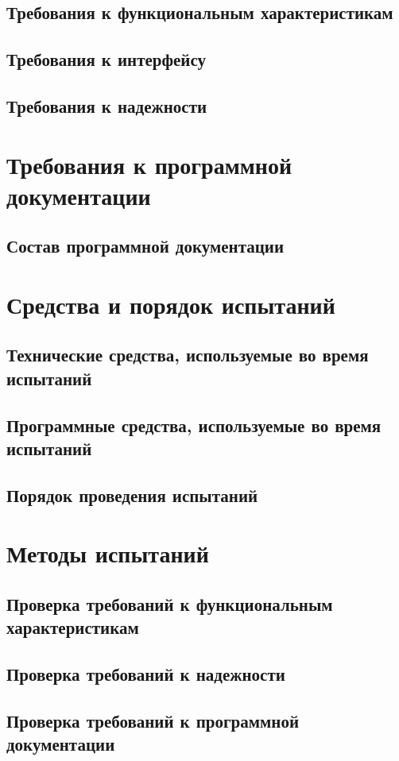 \documentclass[a4paper,12pt]{article}
\begin{document}
	\subsection{Требования к функциональным характеристикам}
	\subsection{Требования к интерфейсу}
	\subsection{Требования к надежности}
	
						\newpage
	\section{Требования к программной документации}
	\subsection{Состав программной документации}
	
						\newpage
	\section{Средства и порядок испытаний}
	\subsection{Технические средства, используемые во время испытаний}
	\subsection{Программные средства, используемые во время испытаний}
	\subsection{Порядок проведения испытаний}
	
						\newpage
	\section{Методы испытаний}
	\subsection{Проверка требований к функциональным характеристикам}
	\subsection{Проверка требований к надежности}
	\subsection{Проверка требований к программной документации}
	
						\newpage
	\listRegistration
\end{document}
